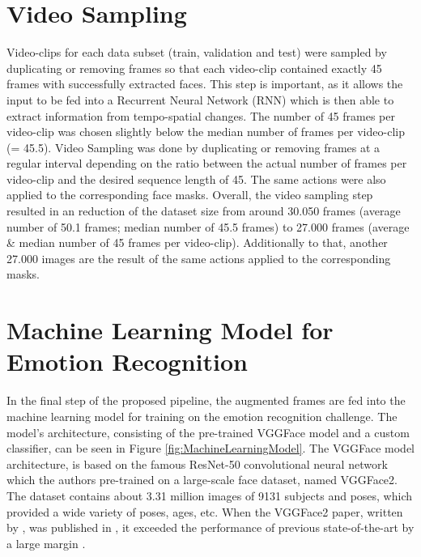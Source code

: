 \section{Video Sampling}
Video-clips for each data subset (train, validation and test) were sampled by duplicating or removing frames so that each video-clip contained exactly 45 frames with successfully extracted faces. This step is important, as it allows the input to be fed into a Recurrent Neural Network (RNN) which is then able to extract information from tempo-spatial changes.
\newline\newline
The number of 45 frames per video-clip was chosen slightly below the median number of frames per video-clip (= 45.5). Video Sampling was done by duplicating or removing frames at a regular interval depending on the ratio between the actual number of frames per video-clip and the desired sequence length of 45. The same actions were also applied to the corresponding face masks.
\newline\newline
Overall, the video sampling step resulted in an reduction of the dataset size from around 30.050 frames (average number of 50.1 frames; median number of 45.5 frames) to 27.000 frames (average \& median number of 45 frames per video-clip). Additionally to that, another 27.000 images are the result of the same actions applied to the corresponding masks.


\section{Machine Learning Model for Emotion Recognition}
In the final step of the proposed pipeline, the augmented frames are fed into the machine learning model for training on the emotion recognition challenge. The model's architecture, consisting of the pre-trained VGGFace model \citep{Cao:2018:VGGFace2} and a custom classifier, can be seen in Figure \ref{fig:MachineLearningModel}.
\newline\newline
The VGGFace model architecture, is based on the famous ResNet-50 convolutional neural network which the authors \citet{Cao:2018:VGGFace2} pre-trained on a large-scale face dataset, named VGGFace2. The dataset contains about 3.31 million images of 9131 subjects and poses, which provided a wide variety of poses, ages, etc. When the VGGFace2 paper, written by \citet{Cao:2018:VGGFace2}, was published in \citeyear{Cao:2018:VGGFace2}, it exceeded the performance of previous state-of-the-art by a large margin \citep{Cao:2018:VGGFace2}.\newline


